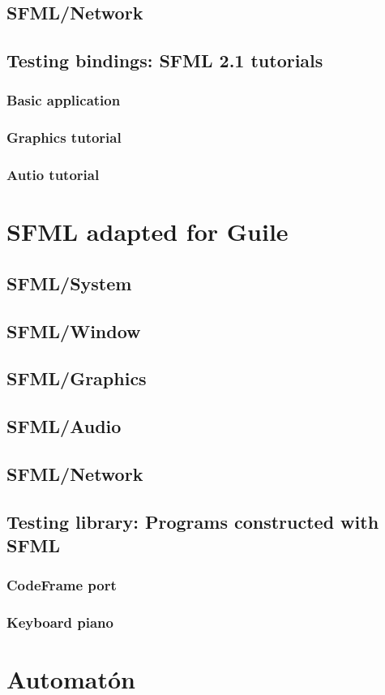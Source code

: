\documentclass[latterpaper, leqno]{article}
\begin{document}
\subsection{SFML/Network}
\subsection{Testing bindings: SFML 2.1 tutorials}
\subsubsection*{Basic application}
\subsubsection*{Graphics tutorial}
\subsubsection*{Autio tutorial}

\section{SFML adapted for Guile}
\subsection{SFML/System}
\subsection{SFML/Window}
\subsection{SFML/Graphics}
\subsection{SFML/Audio}
\subsection{SFML/Network}
\subsection{Testing library: Programs constructed with SFML}
\subsubsection*{CodeFrame port}
\subsubsection*{Keyboard piano}

\section{Automatón}
\end{document}
